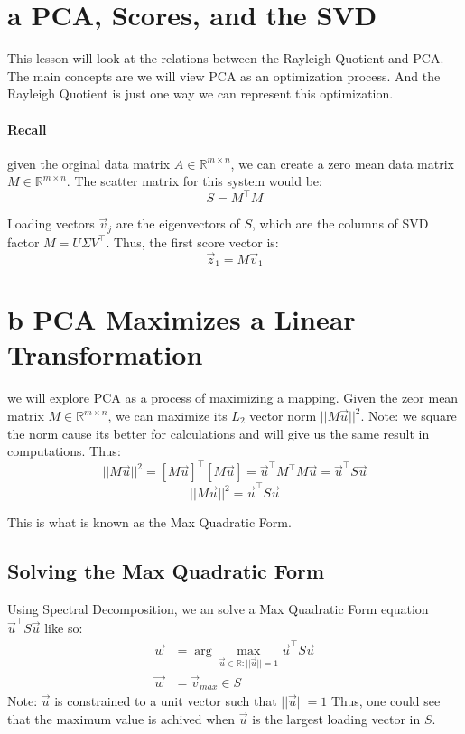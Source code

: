 \documentclass[12pt]{book}
\title{\coursetitle\linebreak\lecturename}
\author{\\Cain Susko\\ 
           \\ \\ \\
      Queen's University 
    \\School of Computing\\}
\begin{document}
\begin{titlepage}
        \maketitle
\end{titlepage}


\section*{a PCA, Scores, and the SVD}
This lesson will look at the relations between the Rayleigh Quotient and PCA.
The main concepts are we will view PCA as an optimization process. And the Rayleigh
Quotient is just one way we can represent this optimization.

\paragraph{Recall}
given the orginal data matrix $A \in \mathbb{R}^{m \times n}$, we can create a zero mean data 
matrix $M \in \mathbb{R}^{m \times n}$. The scatter matrix for this system would be:
\[S = M^\top M\]

Loading vectors $\vec v_j$ are the eigenvectors of $S$, which are the columns of SVD factor
$M = U \Sigma V^\top$. Thus, the first score vector is:
\[\vec z_1 = M\vec v_1\]

\section*{b PCA Maximizes a Linear Transformation}
we will explore PCA as a process of maximizing a mapping. Given the zeor mean matrix 
$M \in \mathbb{R}^{m \times n}$, we can maximize its $L_2$ vector norm $||M\vec u||^2$.
Note: we square the norm cause its better for calculations and will give us the same result 
in computations. Thus:
\[||M\vec u||^2 = [M\vec u]^\top [M\vec u] = \vec u^\top M^\top M \vec u = \vec u^\top S \vec u\]
\[||M\vec u||^2 = \vec u^\top S \vec u\]

This is what is known as the Max Quadratic Form.

\subsection*{Solving the Max Quadratic Form}
Using Spectral Decomposition, we an solve a Max Quadratic Form equation $\vec u^\top S \vec u$
like so:
\begin{align*}
        \vec w &= \arg\max_{\vec u \in \mathbb{R} : ||\vec u|| = 1} \vec u^\top S \vec u\\
        \vec w &= \vec v_{max} \in S
\end{align*}
Note: $\vec u$ is constrained to a unit vector such that $||\vec u||=1$
Thus, one could see that the maximum value is achived when $\vec u$ is the largest loading vector
in $S$.
\end{document}
